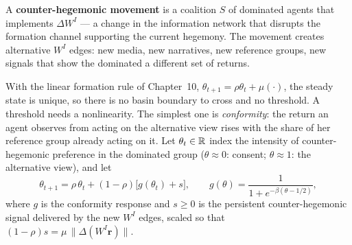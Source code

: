 \documentclass[../structural_economics_book.tex]{subfiles}
\begin{document}
\begin{definition}\label{ch24:def:counter}
A \textbf{counter-hegemonic movement} is a coalition $S$ of dominated agents that implements $\Delta W^I$ --- a change in the information network that disrupts the formation channel supporting the current hegemony. The movement creates alternative $W^I$ edges: new media, new narratives, new reference groups, new signals that show the dominated a different set of returns.
\end{definition}

With the linear formation rule of Chapter~10, $\theta_{t+1} = \rho\theta_t + \mu(\cdot)$, the steady state is unique, so there is no basin boundary to cross and no threshold. A threshold needs a nonlinearity. The simplest one is \emph{conformity}: the return an agent observes from acting on the alternative view rises with the share of her reference group already acting on it. Let $\theta_t \in \mathbb{R}$ index the intensity of counter-hegemonic preference in the dominated group ($\theta \approx 0$: consent; $\theta \approx 1$: the alternative view), and let
\begin{equation}\label{ch24:eq:counter_model}
\theta_{t+1} = \rho\,\theta_t + (1-\rho)\bigl[g(\theta_t) + s\bigr], \qquad g(\theta) = \frac{1}{1 + e^{-\beta(\theta - 1/2)}},
\end{equation}
where $g$ is the conformity response and $s \ge 0$ is the persistent counter-hegemonic signal delivered by the new $W^I$ edges, scaled so that $(1-\rho)s = \mu\,\|\Delta(W^I\mathbf{r})\|$.
\end{document}
